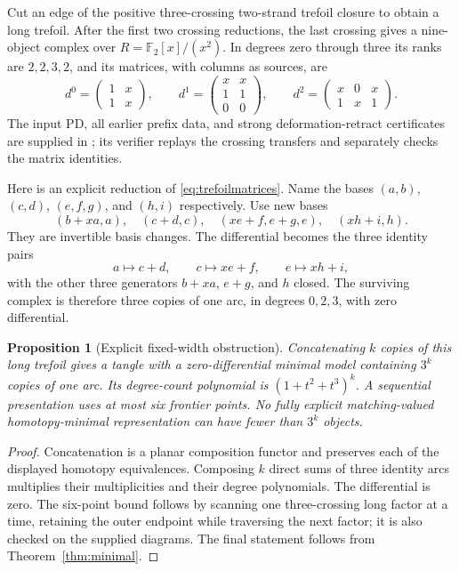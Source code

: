 \documentclass[11pt]{article}
\newtheorem{proposition}[theorem]{Proposition}
\theoremstyle{definition}\newtheorem{definition}[theorem]{Definition}
\theoremstyle{remark}\newtheorem{remark}[theorem]{Remark}
\newcommand{\F}{{\mathbb F_2}}
\newcommand{\code}[1]{\texttt{\detokenize{#1}}}
\begin{document}
Cut an edge of the positive three-crossing two-strand trefoil closure to obtain
a long trefoil. After the first two crossing reductions, the last crossing gives
a nine-object complex over $R=\F[x]/(x^2)$. In degrees zero through three its
ranks are $2,2,3,2$, and its matrices, with columns as sources, are
\begin{equation}\label{eq:trefoilmatrices}
 d^0=\begin{pmatrix}1&x\\1&x\end{pmatrix},\qquad
 d^1=\begin{pmatrix}x&x\\1&1\\0&0\end{pmatrix},\qquad
 d^2=\begin{pmatrix}x&0&x\\1&x&1\end{pmatrix}.
\end{equation}
The input PD, all earlier prefix data, and strong deformation-retract certificates
are supplied in \code{results/chain_certificates.json}; its verifier replays the
crossing transfers and separately checks the matrix identities.

Here is an explicit reduction of \eqref{eq:trefoilmatrices}. Name the bases
$(a,b)$, $(c,d)$, $(e,f,g)$, and $(h,i)$ respectively. Use new bases
\[
 (b+xa,a),\quad (c+d,c),\quad (xe+f,e+g,e),\quad (xh+i,h).
\]
They are invertible basis changes. The differential becomes the three identity
pairs
\[
 a\longmapsto c+d,\qquad c\longmapsto xe+f,\qquad e\longmapsto xh+i,
\]
with the other three generators $b+xa$, $e+g$, and $h$ closed. The surviving complex
is therefore three copies of one arc, in degrees $0,2,3$, with zero differential.

\begin{proposition}[Explicit fixed-width obstruction]\label{prop:trefoil}
Concatenating $k$ copies of this long trefoil gives a tangle with a zero-differential
minimal model containing $3^k$ copies of one arc. Its degree-count polynomial is
$(1+t^2+t^3)^k$. A sequential presentation uses at most six frontier points.
No fully explicit matching-valued homotopy-minimal representation can have fewer
than $3^k$ objects.
\end{proposition}
\begin{proof}
Concatenation is a planar composition functor and preserves each of the displayed
homotopy equivalences. Composing $k$ direct sums of three identity arcs multiplies
their multiplicities and their degree polynomials. The differential is zero.
The six-point bound follows by scanning one three-crossing long factor at a time,
retaining the outer endpoint while traversing the next factor; it is also checked
on the supplied diagrams. The final statement follows from
Theorem~\ref{thm:minimal}.
\end{proof}
\end{document}

